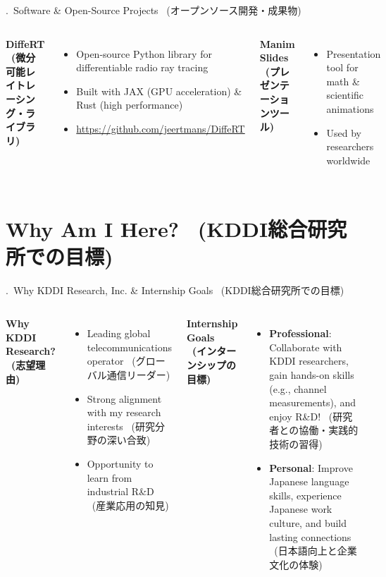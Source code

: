 \documentclass[aspectratio=169,t]{beamer}
\newcommand{\ja}[1]{{\color{textmuted}\footnotesize~\mbox{(#1)}}}
\newcommand{\stitle}[1]{\arabic{section}.~#1}
\begin{document}
\begin{frame}[c]{\stitle{Software \& Open-Source Projects \ja{オープンソース開発・成果物}}}
  \begin{columns}[t]
    \textbf{DiffeRT \ja{微分可能レイトレーシング・ライブラリ}}
    \begin{itemize}
      \item Open-source Python library for differentiable radio ray tracing
      \item Built with JAX (GPU acceleration) \& Rust (high performance)
      \item {\small\url{https://github.com/jeertmans/DiffeRT}}
    \end{itemize}

    \textbf{Manim Slides \ja{プレゼンテーションツール}}
    \begin{itemize}
      \item Presentation tool for math \& scientific animations
      \item Used by researchers worldwide
    \end{itemize}
  \end{columns}
\end{frame}

\section{\texorpdfstring{Why Am I Here? \ja{KDDI総合研究所での目標}}{Why Am I Here?}}

\begin{frame}[c]{\stitle{Why KDDI Research, Inc. \& Internship Goals \ja{KDDI総合研究所での目標}}}
  \begin{columns}[c]
    \textbf{Why KDDI Research? \ja{志望理由}}
    \begin{itemize}
      \item Leading global telecommunications operator \ja{グローバル通信リーダー}
      \item Strong alignment with my research interests \ja{研究分野の深い合致}
      \item Opportunity to learn from industrial R\&D \ja{産業応用の知見}
    \end{itemize}

    \textbf{Internship Goals \ja{インターンシップの目標}}
    \begin{itemize}
      \item \textbf{Professional}: Collaborate with KDDI researchers, gain hands-on skills (e.g., channel measurements), and enjoy R\&D! \ja{研究者との協働・実践的技術の習得}
      \item \textbf{Personal}: Improve Japanese language skills, experience Japanese work culture, and build lasting connections \ja{日本語向上と企業文化の体験}
    \end{itemize}
  \end{columns}
\end{frame}
\end{document}
